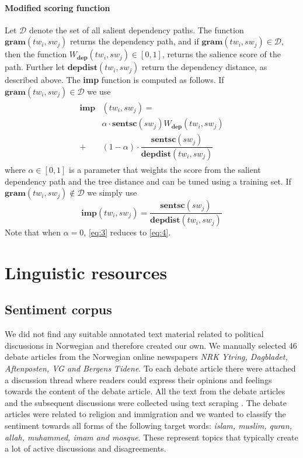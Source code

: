 \documentclass[11pt]{article}
\begin{document}
\paragraph{Modified scoring function}
Let $\mathcal{D}$ denote the set of all salient dependency paths. The function $\mathbf{gram}(tw_i, sw_{j})$ returns the dependency path, and if $\mathbf{gram}(tw_i, sw_{j}) \in \mathcal{D}$, then the function $W_{\mathbf{dep}}(tw_i, sw_{j}) \in [0,1]$, returns the salience score of the path. Further let $\mathbf{depdist}(tw_i, sw_{j})$ return the dependency distance, as described above. The \textbf{imp} function is computed as follows. If $\mathbf{gram}(tw_i, sw_{j}) \in \mathcal{D}$ we use
\begin{align}
  \begin{split}
    \label{eq:3}
  \mathbf{imp}&(tw_i, sw_{j}) = \\
  &\alpha \cdot \mathbf{sentsc}(sw_{j}) W_{\mathbf{dep}}(tw_i, sw_{j}) \\
  +&(1 - \alpha) \cdot \dfrac{\mathbf{sentsc}(sw_{j})}{\mathbf{depdist}(tw_i, sw_{j})}    
  \end{split}
\end{align}
where $\alpha \in [0,1]$ is a parameter that weights the score from the salient dependency path and the tree distance and can be tuned using a training set. If $\mathbf{gram}(tw_i, sw_{j}) \not\in \mathcal{D}$ we simply use 
\begin{equation}
  \label{eq:4}
  \mathbf{imp}(tw_i, sw_{j}) = \dfrac{\mathbf{sentsc}(sw_{j})}{\mathbf{depdist}(tw_i, sw_{j})}    
\end{equation}
Note that when $\alpha = 0$, \eqref{eq:3} reduces to \eqref{eq:4}.


\section{Linguistic resources}
\label{sec:results}

\subsection{Sentiment corpus}

We did not find any suitable annotated text material related to political discussions in Norwegian and therefore created our own. We manually selected 46 debate articles from the Norwegian online newspapers \textit{NRK Ytring, Dagbladet, Aftenposten, VG and Bergens Tidene}. To each debate article there were attached a discussion thread where readers could express their opinions and feelings towards the content of the debate article. All the text from the debate articles and the subsequent discussions were collected using text scraping \cite{Hammer13}. The debate articles were related to religion and immigration and we wanted to classify the sentiment towards all forms of the following target words: \textit{islam, muslim, quran, allah, muhammed, imam and mosque}. These represent topics that typically create a lot of active discussions and disagreements.
\end{document}
